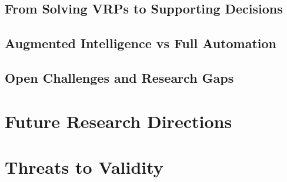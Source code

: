 \documentclass[preprint,12pt]{elsarticle}
\begin{document}
	\subsection{From Solving VRPs to Supporting Decisions}
	
	\subsection{Augmented Intelligence vs Full Automation}
	
	\subsection{Open Challenges and Research Gaps}
	
	\section{Future Research Directions}
	
	\section{Threats to Validity}
	
\end{document}
